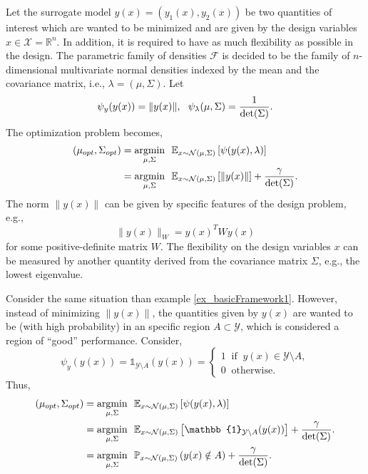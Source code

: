 \begin{example} \label{ex_basicFramework1}
Let the surrogate model $y(x) = (y_1(x), y_2(x))$ be two quantities of interest which are wanted to be minimized and are given by the design variables $x \in \mathcal{X} = \mathbb{R}^n$. 
In addition, it is required to have as much flexibility as possible in the design.
The parametric family of densities $\mathcal{F}$ is decided to be the family of $n$-dimensional multivariate normal densities indexed by the mean and the covariance matrix, i.e., $\lambda = (\mu, \Sigma)$.
Let
$$
  \psi_y(y(x)) = \|y(x)\|, \ \ \psi_{\lambda}(\mu,\Sigma) = \frac{1}{\textup{det}(\Sigma)}.
$$
The optimization problem becomes,
$$
 \begin{aligned}
  (\mu_{opt},\Sigma_{opt}) &= \underset{\mu, \Sigma}{\textup{argmin}} \ \ \mathbb{E}_{x \sim \mathcal{N}(\mu, \Sigma)}\left[ \psi(y(x),\lambda) \right] \\
   &= \underset{\mu, \Sigma}{\textup{argmin}} \ \
      \mathbb{E}_{x \sim \mathcal{N}(\mu, \Sigma)}\left[ \|y(x)\| \right] +
      \frac{\gamma}{\textup{det}(\Sigma)}. \\
 \end{aligned}
$$
The norm $\|y(x)\|$ can be given by specific features of the design problem, e.g., 
$$
  \|y(x)\|_{W} = y(x)^T W y(x) 
$$ 
for some positive\hyp{}definite matrix $W$.
The flexibility on the design variables $x$ can be measured by another quantity derived from the covariance matrix $\Sigma$, e.g., the lowest eigenvalue. 
\end{example}

\begin{example} \label{ex_basicFramework2}
Consider the same situation than example \ref{ex_basicFramework1}. However, instead of minimizing $\|y(x)\|$, the quantities given by $y(x)$ are wanted to be (with high probability) in an specific region $A \subset \mathcal{Y}$, which is considered a region of ``good'' performance.
Consider,
$$
  \psi_y(y(x)) = \mathbb{1}_{\mathcal{Y} \setminus A}(y(x)) = \left\{ 
    \begin{array}{l}
      1 \ \text{ if } \ y(x) \in \mathcal{Y} \setminus A, \\
      0 \ \text{ otherwise.}
    \end{array} \right.
$$
Thus,
$$
 \begin{aligned}
  (\mu_{opt},\Sigma_{opt}) &= \underset{\mu, \Sigma}{\textup{argmin}} \ \ \mathbb{E}_{x \sim \mathcal{N}(\mu, \Sigma)}\left[ \psi(y(x),\lambda) \right] \\
   &= \underset{\mu, \Sigma}{\textup{argmin}} \ \
      \mathbb{E}_{x \sim \mathcal{N}(\mu, \Sigma)}\left[ \mathbb{1}_{\mathcal{Y} \setminus A}(y(x)) \right] +
      \frac{\gamma}{\textup{det}(\Sigma)}. \\
   &= \underset{\mu, \Sigma}{\textup{argmin}} \ \
      \mathbb{P}_{x \sim \mathcal{N}(\mu, \Sigma)}\left( y(x) \notin  A \right) +
      \frac{\gamma}{\textup{det}(\Sigma)}. \\
 \end{aligned}
$$
\end{example}

